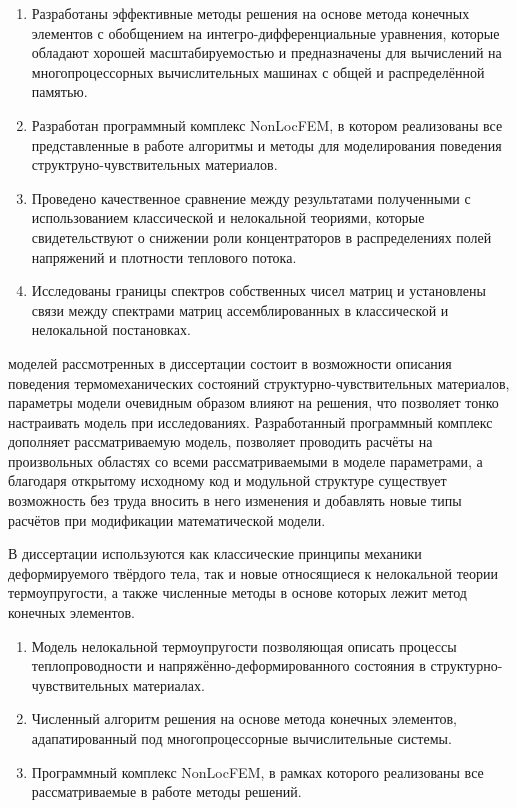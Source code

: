 {\novelty}
\begin{enumerate}[beginpenalty=10000] %
  \item Разработаны эффективные методы решения на основе метода конечных элементов с обобщением на интегро-дифференциальные уравнения, которые обладают хорошей масштабируемостью и предназначены для вычислений на многопроцессорных вычислительных машинах с общей и распределённой памятью.
  \item Разработан программный комплекс NonLocFEM, в котором реализованы все представленные в работе алгоритмы и методы для моделирования поведения структруно-чувствительных материалов.
  \item Проведено качественное сравнение между результатами полученными с использованием классической и нелокальной теориями, которые свидетельствуют о снижении роли концентраторов в распределениях полей напряжений и плотности теплового потока.
  \item Исследованы границы спектров собственных чисел матриц и установлены связи между спектрами матриц ассемблированных в классической и нелокальной постановках.
\end{enumerate}

{\influence}
моделей рассмотренных в диссертации состоит в возможности описания поведения термомеханических состояний структурно-чувствительных материалов, параметры модели очевидным образом влияют на решения, что позволяет тонко настраивать модель при исследованиях. Разработанный программный комплекс дополняет рассматриваемую модель, позволяет проводить расчёты на произвольных областях со всеми рассматриваемыми в моделе параметрами, а благодаря открытому исходному код и модульной структуре существует возможность без труда вносить в него изменения и добавлять новые типы расчётов при модификации математической модели.

{\methods}
В диссертации используются как классические принципы механики деформируемого твёрдого тела, так и новые относящиеся к нелокальной теории термоупругости, а также численные методы в основе которых лежит метод конечных элементов.

{}
\begin{enumerate}[beginpenalty=10000] %
 	\item Модель нелокальной термоупругости позволяющая описать процессы теплопроводности и напряжённо-деформированного состояния в структурно-чувствительных материалах.
	\item Численный алгоритм решения на основе метода конечных элементов, адапатированный под многопроцессорные вычислительные системы.
	\item Программный комплекс NonLocFEM, в рамках которого реализованы все рассматриваемые в работе методы решений.
\end{enumerate}


